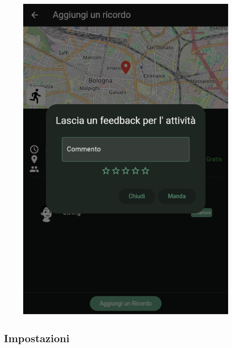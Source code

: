 \documentclass[a4paper,12pt]{article}
\begin{document}
\begin{figure}[H]
\begin{minipage}{0.32\textwidth}
        \includegraphics[width=1\linewidth]{img/add_feedback.png}
    \end{minipage}
\end{figure}


\subsection{Impostazioni}
\end{document}
